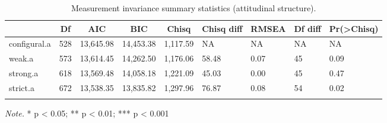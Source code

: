 \documentclass[
  man]{apa7}
\begin{document}
\begin{table}[tbp]

\begin{center}
\begin{threeparttable}

\caption{\label{tab:measinv.pilot.att}Measurement invariance summary statistics (attitudinal structure).}

\begin{tabular}{lllllllll}
\toprule
 & \multicolumn{1}{c}{Df} & \multicolumn{1}{c}{AIC} & \multicolumn{1}{c}{BIC} & \multicolumn{1}{c}{Chisq} & \multicolumn{1}{c}{Chisq diff} & \multicolumn{1}{c}{RMSEA} & \multicolumn{1}{c}{Df diff} & \multicolumn{1}{c}{Pr(>Chisq)}\\
\midrule
configural.a & 528 & 13,645.98 & 14,453.38 & 1,117.59 & NA & NA & NA & NA\\
weak.a & 573 & 13,614.45 & 14,262.50 & 1,176.06 & 58.48 & 0.07 & 45 & 0.09\\
strong.a & 618 & 13,569.48 & 14,058.18 & 1,221.09 & 45.03 & 0.00 & 45 & 0.47\\
strict.a & 672 & 13,538.35 & 13,835.82 & 1,297.96 & 76.87 & 0.08 & 54 & 0.02\\
\bottomrule
\addlinespace
\end{tabular}

\begin{tablenotes}[para]
\normalsize{\textit{Note.} * p < 0.05; ** p < 0.01; *** p < 0.001}
\end{tablenotes}

\end{threeparttable}
\end{center}

\end{table}
\end{document}
